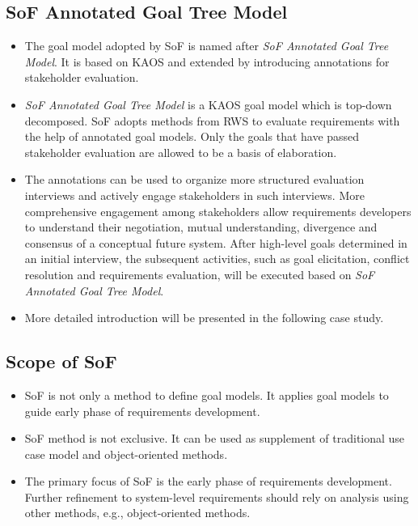 ﻿\documentclass{beamer}
\begin{document}
\subsection{SoF Annotated Goal Tree Model}
\begin{frame}              %
  \footnotesize{
    \begin{itemize}
    \item The goal model adopted by SoF is named after \emph{SoF Annotated Goal Tree Model}. It is based on KAOS and extended by introducing annotations for stakeholder evaluation.\pause
    \item \emph{SoF Annotated Goal Tree Model} is a KAOS goal model which is top-down decomposed. SoF adopts methods from RWS to evaluate requirements with the help of annotated goal models. Only the goals that have passed stakeholder evaluation are allowed to be a basis of elaboration.\pause
    \item 
      The annotations can be used to organize more structured evaluation interviews and actively engage stakeholders in such interviews. More comprehensive engagement among stakeholders allow requirements developers to understand their negotiation, mutual understanding, divergence and consensus of a conceptual future system. After high-level goals determined in an initial interview, the subsequent activities, such as goal elicitation, conflict resolution and requirements evaluation, will be executed based on \emph{SoF Annotated Goal Tree Model}.\pause
    \item More detailed introduction will be presented in the following case study.
    \end{itemize}
  }
\end{frame}

\subsection{Scope of SoF}
\begin{frame}              %
  \begin{itemize}
  \item SoF is not only a method to define goal models. It applies goal models to guide early phase of requirements development.\pause
  \item SoF method is not exclusive. It can be used as supplement of traditional use case model and object-oriented methods.\pause
  \item The primary focus of SoF is the early phase of requirements development. Further refinement to system-level requirements should rely on analysis using other methods, e.g., object-oriented methods.\pause
  \end{itemize}  
\end{frame}
\end{document}
